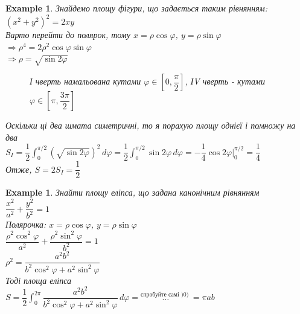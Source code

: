 \documentclass[a4paper, 14pt]{extarticle}
\def\huge{\displaystyle}
\def\bigline{\vspace{5mm}\\}
\theoremstyle{theoremdd}
\theoremstyle{theoremdd}
\theoremstyle{theoremdd}
\theoremstyle{theoremdd}
\newtheorem{example}[theorem]{Example}
\theoremstyle{theoremdd}
\theoremstyle{theoremdd}
\theoremstyle{theoremdd}
\theoremstyle{theoremdd}
\begin{document}
\begin{example}
Знайдемо площу фігури, що задається таким рівнянням: $(x^2+y^2)^2 = 2xy$\\
Варто перейти до полярок, тому $x = \rho \cos \varphi$, $y = \rho \sin \varphi$\\
$\Rightarrow \rho^4 = 2 \rho^2 \cos \varphi \sin \varphi$\\
$\Rightarrow \rho = \sqrt{\sin 2\varphi}$
\begin{figure}[H]
\centering
{}
\caption*{І чверть намальована кутами $\varphi \in \left[ 0, \dfrac{\pi}{2} \right]$, ІV чверть - кутами $\varphi \in \left[ \pi, \dfrac{3\pi}{2} \right]$}
\end{figure}
Оскільки ці два шмата симетричні, то я порахую площу однієї і помножу на два\\
$S_I = \dfrac{1}{2} \huge\int_0^{\pi/2} (\sqrt{\sin 2\varphi})^2 \,d \varphi = \dfrac{1}{2} \huge\int_0^{\pi/2} \sin 2\varphi \,d\varphi = -\dfrac{1}{4} \cos 2\varphi \Big|_0^{\pi/2} = \dfrac{1}{4}$\\
Отже, $S = 2 S_I = \dfrac{1}{2}$
\end{example}

\begin{example}
Знайти площу еліпса, що задана канонічним рівнянням\\
$\dfrac{x^2}{a^2} + \dfrac{y^2}{b^2} = 1$\\
Полярочка: $x = \rho \cos \varphi$, $y = \rho \sin \varphi$\\
$\dfrac{\rho^2 \cos^2 \varphi}{a^2} + \dfrac{\rho^2 \sin^2 \varphi}{b^2} = 1$\\
$\rho^2 = \dfrac{a^2b^2}{b^2 \cos^2 \varphi + a^2 \sin^2 \varphi}$\\
Тоді площа еліпса\\
$S = \dfrac{1}{2} \huge\int_{0}^{2\pi} \dfrac{a^2b^2}{b^2 \cos^2 \varphi + a^2 \sin^2 \varphi} \,d\varphi = \overset{\text{спробуйте самі )0) }}{\dots} = \pi ab$
\bigline
\end{example}
\end{document}
